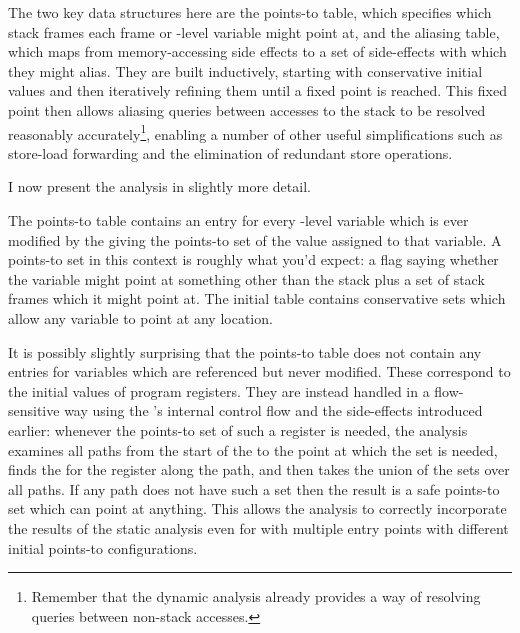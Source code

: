 The two key data structures here are the points-to table, which
specifies which stack frames each frame or {\StateMachine}-level
variable might point at, and the aliasing table, which maps from
memory-accessing side effects to a set of side-effects with which they
might alias.  They are built inductively, starting with
conservative initial values
and then iteratively refining them until a fixed point is reached.
This fixed point then allows aliasing queries between accesses to the
stack to be resolved reasonably accurately\footnote{Remember that the
  dynamic analysis already provides a way of resolving queries between
  non-stack accesses.}, enabling a number of other useful
simplifications such as store-load forwarding and the elimination of
redundant store operations.

I now present the analysis in slightly more detail.

The points-to table contains an entry for every {\StateMachine}-level
variable which is ever modified by the {\StateMachine} giving the
points-to set of the value assigned to that variable.  A points-to set
in this context is roughly what you'd expect: a flag saying whether
the variable might point at something other than the stack plus a set
of stack frames which it might point at.  The initial table contains
conservative sets which allow any variable to point at any location.

It is possibly slightly surprising that the points-to table does not
contain any entries for variables which are referenced but never
modified.  These correspond to the initial values of program
registers.  They are instead handled in a flow-sensitive way using the
{\StateMachine}'s internal control flow and the 
side-effects introduced earlier: whenever the points-to set of such a
register is needed, the analysis examines all paths from the start of
the {\StateMachine} to the point at which the set is needed, finds the
 for the register along the path, and then takes the
union of the sets over all paths.  If any path does not have such a
set then the result is a safe points-to set which can point at
anything.  This allows the analysis to correctly incorporate the
results of the static analysis even for {\StateMachines} with multiple
entry points with different initial points-to configurations.


